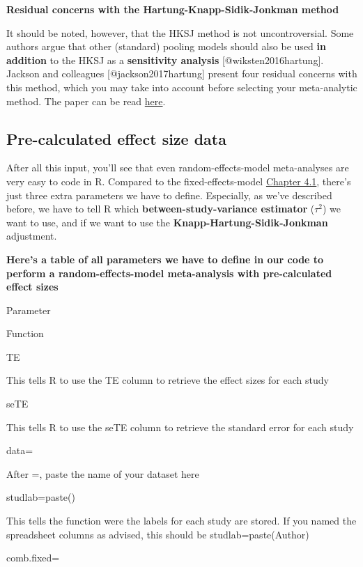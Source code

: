 \documentclass[]{book}
\begin{document}
\begin{rmdachtung}
\textbf{Residual concerns with the Hartung-Knapp-Sidik-Jonkman method}

It should be noted, however, that the HKSJ method is not
uncontroversial. Some authors argue that other (standard) pooling models
should also be used \textbf{in addition} to the HKSJ as a
\textbf{sensitivity analysis} {[}@wiksten2016hartung{]}. Jackson and
colleagues {[}@jackson2017hartung{]} present four residual concerns with
this method, which you may take into account before selecting your
meta-analytic method. The paper can be read
\href{https://onlinelibrary.wiley.com/doi/pdf/10.1002/sim.7411}{here}.
\end{rmdachtung}

\hypertarget{random.precalc}{%
\subsection{Pre-calculated effect size data}\label{random.precalc}}

After all this input, you'll see that even random-effects-model meta-analyses are very easy to code in R. Compared to the fixed-effects-model \protect\hyperlink{fixed}{Chapter 4.1}, there's just three extra parameters we have to define. Especially, as we've described before, we have to tell R which \textbf{between-study-variance estimator} (\(\tau^{2}\)) we want to use, and if we want to use the \textbf{Knapp-Hartung-Sidik-Jonkman} adjustment.

\textbf{Here's a table of all parameters we have to define in our code to perform a random-effects-model meta-analysis with pre-calculated effect sizes}

Parameter

Function

TE

This tells R to use the TE column to retrieve the effect sizes for each study

seTE

This tells R to use the seTE column to retrieve the standard error for each study

data=

After =, paste the name of your dataset here

studlab=paste()

This tells the function were the labels for each study are stored. If you named the spreadsheet columns as advised, this should be studlab=paste(Author)

comb.fixed=
\end{document}
